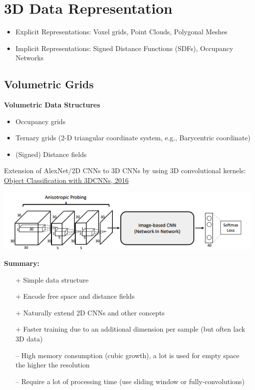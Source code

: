 \section{3D Data Representation}

\begin{itemize}
    \item Explicit Representations: Voxel grids, Point Clouds, Polygonal Meshes
    \item Implicit Representations: Signed Distance Functions (SDFs), Occupancy Networks
\end{itemize}


\subsection{Volumetric Grids}

\textbf{Volumetric Data Structures}
\begin{itemize}
    \item Occupancy grids
    \item Ternary grids (2-D triangular coordinate system, e.g., Barycentric coordinate)
    \item (Signed) Distance fields
\end{itemize}

Extension of AlexNet/2D CNNs to 3D CNNs by using 3D convolutional kernels:
\href{https://arxiv.org/pdf/1604.03265}{Object Classification with 3DCNNs, 2016}

\begin{center}
    \includegraphics[width=\columnwidth]{images/3D_CNN.jpeg}
    \label{fig:3D_CNN}
\end{center}


\textbf{Summary:}
\begin{itemize}[label={}] %
    \item[+] Simple data structure
    \item[+] Encode free space and distance fields
    \item[+] Naturally extend 2D CNNs and other concepts
    \item[+] Faster training due to an additional dimension per sample (but often lack 3D data)
    \item[--] High memory consumption (cubic growth), a lot is used for empty space the higher the resolution
    \item[--] Require a lot of processing time (use sliding window or fully-convolutions)
\end{itemize}

